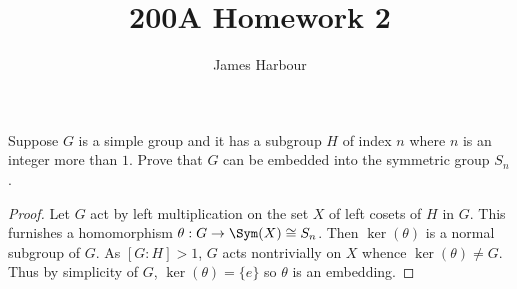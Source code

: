\documentclass[12pt]{article}
\title{200A Homework 2}
\author{James Harbour}
\begin{document}
\maketitle

\begin{homeworkProblem}
  Suppose $G$ is a simple group and it has a subgroup $H$ of index $n$ where $n$ is an integer more than $1$. Prove that $G$ can be embedded into the symmetric group $S_n$.

  \begin{proof}
    Let $ G $ act by left multiplication on the set $ X $ of left cosets of $ H $ in $ G $. This furnishes a homomorphism $ \theta: G\to \Sym(X)\cong S_{n} $. Then $ \ker(\theta) $ is a normal subgroup of $ G $. As $ [G:H] >1 $, $ G $ acts nontrivially on $ X $ whence $ \ker(\theta)\neq G $. Thus by simplicity of $ G $, $ \ker(\theta)=\{e\} $ so $ \theta $ is an embedding.
  \end{proof}
\end{homeworkProblem}
\end{document}
